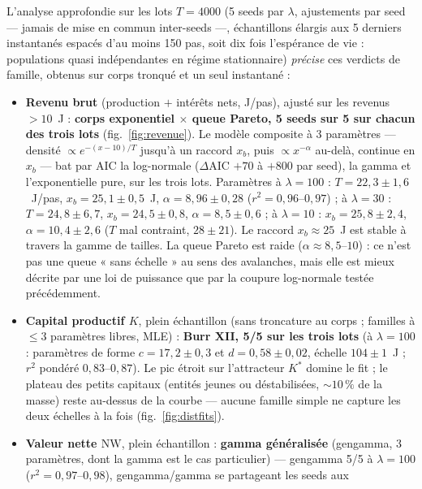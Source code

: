 \documentclass[11pt,a4paper]{article}
\newcommand{\NW}{\mathrm{NW}}
\begin{document}
L'analyse approfondie sur les lots $T{=}4000$ (5 seeds par $\lambda$,
ajustements par seed --- jamais de mise en commun inter-seeds ---,
échantillons élargis aux 5 derniers instantanés espacés d'au moins 150
pas, soit dix fois l'espérance de vie : populations quasi indépendantes en
régime stationnaire) \emph{précise} ces verdicts de famille, obtenus sur
corps tronqué et un seul instantané :

\begin{itemize}[nosep]
\item \textbf{Revenu brut} (production $+$ intérêts nets, J/pas),
  ajusté sur les revenus $> 10$~J : \textbf{corps exponentiel $\times$
  queue Pareto, 5 seeds sur 5 sur chacun des trois lots}
  (fig.~\ref{fig:revenue}). Le modèle composite à 3 paramètres ---
  densité $\propto e^{-(x - 10)/T}$ jusqu'à un raccord $x_b$, puis
  $\propto x^{-\alpha}$ au-delà, continue en $x_b$ --- bat par AIC la
  log-normale ($\Delta$AIC $+70$ à $+800$ par seed), la gamma et
  l'exponentielle pure, sur les trois lots. Paramètres à
  $\lambda{=}100$ : $T = 22{,}3 \pm 1{,}6$~J/pas, $x_b = 25{,}1 \pm
  0{,}5$~J, $\alpha = 8{,}96 \pm 0{,}28$ ($r^2 = 0{,}96$--$0{,}97$) ;
  à $\lambda{=}30$ : $T = 24{,}8 \pm 6{,}7$, $x_b = 24{,}5 \pm 0{,}8$,
  $\alpha = 8{,}5 \pm 0{,}6$ ; à $\lambda{=}10$ : $x_b = 25{,}8 \pm
  2{,}4$, $\alpha = 10{,}4 \pm 2{,}6$ ($T$ mal contraint,
  $28 \pm 21$). Le raccord $x_b \approx 25$~J est stable à travers la
  gamme de tailles. La queue Pareto est raide ($\alpha \approx
  8{,}5$--$10$) : ce n'est pas une queue « sans échelle » au sens des
  avalanches, mais elle est mieux décrite par une loi de puissance que
  par la coupure log-normale testée précédemment.
\item \textbf{Capital productif $K$}, plein échantillon (sans troncature
  au corps ; familles à $\le 3$ paramètres libres, MLE) : \textbf{Burr
  XII, 5/5 sur les trois lots} (à $\lambda{=}100$ : paramètres de forme
  $c = 17{,}2 \pm 0{,}3$ et $d = 0{,}58 \pm 0{,}02$, échelle
  $104 \pm 1$~J ; $r^2$ pondéré $0{,}83$--$0{,}87$). Le pic étroit sur
  l'attracteur $K^*$ domine le fit ; le plateau des petits capitaux
  (entités jeunes ou déstabilisées, ${\sim}10\,\%$ de la masse) reste
  au-dessus de la courbe --- aucune famille simple ne capture les deux
  échelles à la fois (fig.~\ref{fig:distfits}).
\item \textbf{Valeur nette $\NW$}, plein échantillon : \textbf{gamma
  généralisée} (gengamma, 3 paramètres, dont la gamma est le cas
  particulier) --- gengamma 5/5 à $\lambda{=}100$ ($r^2 =
  0{,}97$--$0{,}98$), gengamma/gamma se partageant les seeds aux

\end{itemize}
\end{document}

